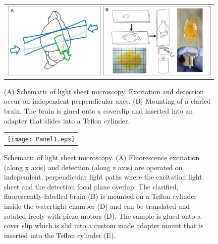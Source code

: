 \documentclass[12pt]{spieman}  %
\begin{document}
\begin{figure}
   \begin{center}
   \begin{tabular}{c}
   \includegraphics[width=\textwidth]{PanelSampel.eps}
   \end{tabular}
   \end{center}
   \caption{\label{fig:Panel0} (A) Schematic of light sheet microscopy.  Excitation and detection occur on independent perpendicular axes. (B) Mounting of a claried brain. The brain is glued onto a coverslip and inserted into an adapter that slides into a Teflon cylinder.} 
   \end{figure}

\begin{figure}
   \begin{center}
   \begin{tabular}{c}
   \texttt{[image: Panel1.eps]}
   \end{tabular}
   \end{center}
   \caption{\label{fig:Panel1} Schematic of light sheet microscopy. (A) Fluorescence excitation (along x axis) and detection (along z axis) are operated on independent, perpendicular light paths where the excitation light sheet and the detection focal plane overlap. The clarified, fluorescently-labelled brain (B) is mounted on a Teflon cylinder inside the watertight chamber (D) and can be translated and rotated freely with piezo motors (D). The sample is glued onto a cover slip which is slid into a custom made adapter mount that is inserted into the Teflon cylinder (E).} 
   \end{figure}
\end{document}
